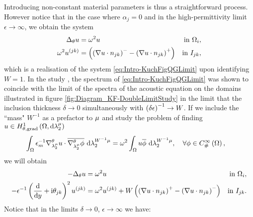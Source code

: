 Introducing non-constant material parameters is thus a straightforward process.
However notice that in the case where $\alpha_j=0$ and in the high-permittivity limit $\epsilon\rightarrow\infty$, we obtain the system
\begin{subequations}
	\begin{align*}
		\Delta_\theta u 
		&= \omega^2 u 
		&\text{in } \Omega_i, \\
		\omega^2 u^{(jk)}
		&= \left( \left( \nabla u\cdot n_{jk} \right)^- - \left( \nabla u\cdot n_{jk} \right)^+ \right)
		&\text{in } I_{jk},
	\end{align*}
\end{subequations}
which is a realisation of the system \eqref{eq:Intro-KuchFigQGLimit} upon identifying $W=1$.
In the study \cite{figotin1998spectral}, the spectrum of \eqref{eq:Intro-KuchFigQGLimit} was shown to coincide with the limit of the spectra of the acoustic equation on the domains illustrated in figure  \ref{fig:Diagram_KF-DoubleLimitStudy} in the limit that the inclusion thickness $\delta\rightarrow0$ simultaneously with $\left( \delta\epsilon \right)^{-1}\rightarrow W$.
If we include the ``mass" $W^{-1}$ as a prefactor to $\mu$ and study the problem of finding $u\in H^1_{\theta, \mathrm{grad}}\left( \Omega, \mathrm{d}\lambda_2^{\mu} \right)$
\begin{align*}
	\int_{\Omega} \epsilon_m^{-1}\nabla^{\theta}_{\lambda_2^{\mu}}u\cdot\overline{\nabla^{\theta}_{\lambda_2^{\mu}}\phi}  \ \mathrm{d}\lambda_2^{W^{-1}\mu}
	&= \omega^2 \int_{\Omega} u\overline{\phi}  \ \mathrm{d}\lambda_2^{W^{-1}\mu}, \quad\forall\phi\in C^{\infty}_{\#}\left( \Omega \right),
\end{align*}
we will obtain
\begin{subequations}
	\begin{align*}
		-\Delta_\theta u 
		&= \omega^2 u 
		&\text{in } \Omega_i, \\
		- \epsilon^{-1}\left( \dfrac{\mathrm{d}}{\mathrm{d}y} + \mathrm{i}\theta_{jk} \right)^2u^{(jk)}  
		&= \omega^2 u^{(jk)} + W\left( \left( \nabla u\cdot n_{jk} \right)^+ - \left( \nabla u\cdot n_{jk} \right)^- \right)
		&\text{in } I_{jk}.
	\end{align*}
\end{subequations}
Notice that in the limits $\delta\rightarrow0$, $\epsilon\rightarrow\infty$ we have:
